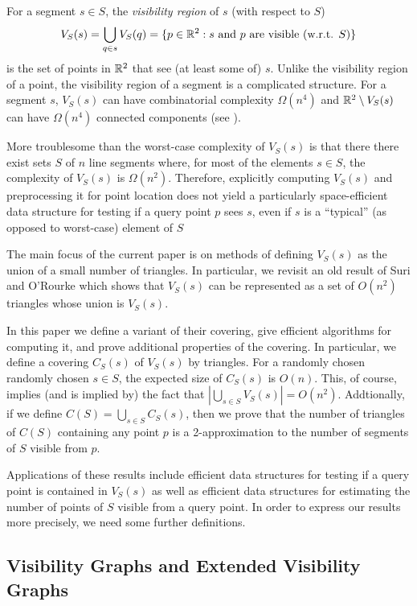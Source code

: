 \documentclass{patmorin}
\begin{document}
For a segment $s\in S$, the \emph{visibility region} of $s$ (with respect
to $S$)
\[
   V_S(s) = \bigcup_{q\in s} V_S(q)
          = \{p\in\mathbb{R}^2:\mbox{$s$ and $p$ are visible (w.r.t. $S$)} \}
\]
is the set of points in $\mathbb{R}^2$ that see (at least some of) $s$.  Unlike
the visibility region of a point, the visibility region of a segment is a
complicated structure.  For a segment $s$, $V_S(s)$ can have combinatorial
complexity $\Omega(n^4)$ and $\mathbb{R}^2\setminus V_S(s)$ can have $\Omega(n^4)$
connected components \cite[Figure~8.13]{o87}\cite[Lemma~12]{fhjmz08}
(see ).

More troublesome than the worst-case complexity of $V_S(s)$ is that
there there exist sets $S$ of $n$ line segments where, for most of
the elements $s\in S$, the complexity of $V_S(s)$ is $\Omega(n^2)$.
Therefore, explicitly computing $V_S(s)$ and preprocessing it for point
location does not yield a particularly space-efficient data structure
for testing if a query point $p$ sees $s$, even if $s$ is a ``typical''
(as opposed to worst-case) element of $S$

The main focus of the current paper is on methods of defining $V_S(s)$
as the union of a small number of triangles.  In particular, we revisit
an old result of Suri and O'Rourke \cite{so84} which shows that $V_S(s)$
can be represented as a set of $O(n^2)$ triangles whose union is $V_S(s)$.

In this paper we define a variant of their covering, give efficient
algorithms for computing it, and prove additional properties of the
covering. In particular, we define a covering $C_S(s)$ of $V_S(s)$ by
triangles.  For a randomly chosen randomly chosen $s\in S$, the expected
size of $C_S(s)$ is $O(n)$.  This, of course, implies (and is implied by)
the fact that $|\bigcup_{s\in S} V_S(s)|=O(n^2)$.  Addtionally, if we
define $C(S)=\bigcup_{s\in S} C_S(s)$, then we prove that the number of
triangles of $C(S)$ containing any point $p$ is a 2-approximation to the
number of segments of $S$ visible from $p$.

Applications of these results include efficient data structures for testing
if a query point is contained in $V_S(s)$ as well as efficient data
structures for estimating the number of points of $S$ visible from a query
point. In order to express our results more precisely, we need some further
definitions.

\subsection{Visibility Graphs and Extended Visibility Graphs}
\end{document}
